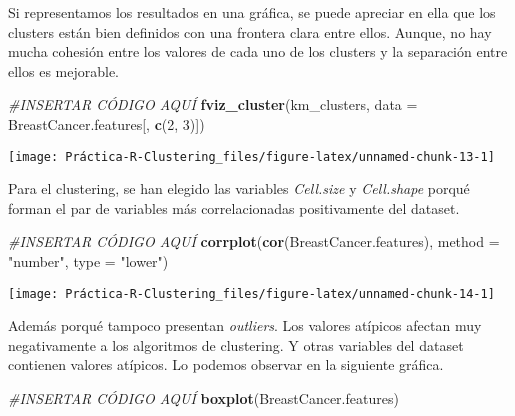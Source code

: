 \documentclass[]{article}
\newenvironment{Shaded}{\begin{snugshade}}{\end{snugshade}}
\newcommand{\CommentTok}[1]{\textcolor[rgb]{0.56,0.35,0.01}{\textit{#1}}}
\newcommand{\DataTypeTok}[1]{\textcolor[rgb]{0.13,0.29,0.53}{#1}}
\newcommand{\DecValTok}[1]{\textcolor[rgb]{0.00,0.00,0.81}{#1}}
\newcommand{\KeywordTok}[1]{\textcolor[rgb]{0.13,0.29,0.53}{\textbf{#1}}}
\newcommand{\NormalTok}[1]{#1}
\newcommand{\StringTok}[1]{\textcolor[rgb]{0.31,0.60,0.02}{#1}}
\begin{document}
Si representamos los resultados en una gráfica, se puede apreciar en
ella que los clusters están bien definidos con una frontera clara entre
ellos. Aunque, no hay mucha cohesión entre los valores de cada uno de
los clusters y la separación entre ellos es mejorable.

\begin{Shaded}
\begin{Highlighting}[]
\CommentTok{#INSERTAR CÓDIGO AQUÍ}
\KeywordTok{fviz_cluster}\NormalTok{(km_clusters, }\DataTypeTok{data =}\NormalTok{ BreastCancer.features[, }\KeywordTok{c}\NormalTok{(}\DecValTok{2}\NormalTok{, }\DecValTok{3}\NormalTok{)])}
\end{Highlighting}
\end{Shaded}

\begin{center}\texttt{[image: Práctica-R-Clustering\_files/figure-latex/unnamed-chunk-13-1]} \end{center}

Para el clustering, se han elegido las variables \emph{Cell.size} y
\emph{Cell.shape} porqué forman el par de variables más correlacionadas
positivamente del dataset.

\begin{Shaded}
\begin{Highlighting}[]
\CommentTok{#INSERTAR CÓDIGO AQUÍ}
\KeywordTok{corrplot}\NormalTok{(}\KeywordTok{cor}\NormalTok{(BreastCancer.features), }\DataTypeTok{method =} \StringTok{"number"}\NormalTok{, }\DataTypeTok{type =} \StringTok{"lower"}\NormalTok{)}
\end{Highlighting}
\end{Shaded}

\begin{center}\texttt{[image: Práctica-R-Clustering\_files/figure-latex/unnamed-chunk-14-1]} \end{center}

Además porqué tampoco presentan \emph{outliers}. Los valores atípicos
afectan muy negativamente a los algoritmos de clustering. Y otras
variables del dataset contienen valores atípicos. Lo podemos observar en
la siguiente gráfica.

\begin{Shaded}
\begin{Highlighting}[]
\CommentTok{#INSERTAR CÓDIGO AQUÍ}
\KeywordTok{boxplot}\NormalTok{(BreastCancer.features)}
\end{Highlighting}
\end{Shaded}
\end{document}
